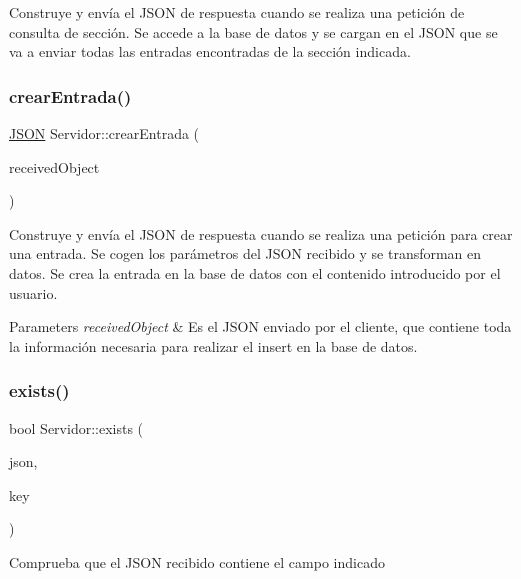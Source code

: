 Construye y envía el J\+S\+ON de respuesta cuando se realiza una petición de consulta de sección. Se accede a la base de datos y se cargan en el J\+S\+ON que se va a enviar todas las entradas encontradas de la sección indicada. \mbox{\label{classServidor_a211b7b43cd2b5d81b1f21413bce9fbf2}} 
\subsubsection{\texorpdfstring{crear\+Entrada()}{crearEntrada()}}
{\footnotesize\ttfamily \mbox{\hyperlink{classnlohmann_1_1basic__json}{J\+S\+ON}} Servidor\+::crear\+Entrada (\begin{DoxyParamCaption}\item[{\mbox{\hyperlink{classnlohmann_1_1basic__json}{J\+S\+ON}}}]{received\+Object }\end{DoxyParamCaption})}

Construye y envía el J\+S\+ON de respuesta cuando se realiza una petición para crear una entrada. Se cogen los parámetros del J\+S\+ON recibido y se transforman en datos. Se crea la entrada en la base de datos con el contenido introducido por el usuario. 
\begin{DoxyParams}{Parameters}
{\em received\+Object} & Es el J\+S\+ON enviado por el cliente, que contiene toda la información necesaria para realizar el insert en la base de datos. \\
\hline
\end{DoxyParams}
\mbox{\label{classServidor_a41f9f66959c43b27d1d13cf4f20eca55}} 
\subsubsection{\texorpdfstring{exists()}{exists()}}
{\footnotesize\ttfamily bool Servidor\+::exists (\begin{DoxyParamCaption}\item[{const \mbox{\hyperlink{classnlohmann_1_1basic__json}{J\+S\+ON}} \&}]{json,  }\item[{const std\+::string \&}]{key }\end{DoxyParamCaption})}

Comprueba que el J\+S\+ON recibido contiene el campo indicado \mbox{\label{classServidor_ae784cce9d89f9f9ca0804abdb9c3c9d7}} 
